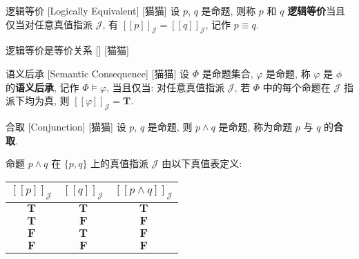 \documentclass[UTF8]{ctexart}
\newcommand{\LT}{\ensuremath{\mathbf{T}}}
\newcommand{\LF}{\ensuremath{\mathbf{F}}}
\newcommand{\assign}[2]{\ensuremath{{[\![#1]\!]}_{#2}}}
\begin{document}
            \begin{dfn}
                []
                {逻辑等价}
                [Logically Equivalent]
                [猫猫]
                设 \(p\), \(q\) 是命题, 则称 \(p\) 和 \(q\) \textbf{逻辑等价}当且仅当对任意真值指派 \(\mathcal{J}\), 有 \(\assign{p}{\mathcal{J}}=\assign{q}{\mathcal{J}}\), 记作 \(p\equiv q\). 
            \end{dfn}

            \begin{ppt}
                []
                {逻辑等价是等价关系}
                []
                [猫猫]
            \end{ppt}

            \begin{dfn}
                []
                {语义后承}
                [Semantic Consequence]
                [猫猫]
                设 \(\Phi\) 是命题集合, \(\varphi\) 是命题, 称 \(\varphi\) 是 \(\phi\) 的\textbf{语义后承}, 记作 \(\Phi\models\varphi\), 当且仅当: 对任意真值指派 \(\mathcal{J}\), 若 \(\Phi\) 中的每个命题在 \(\mathcal{J}\) 指派下均为真, 则 \(\assign{\varphi}{\mathcal{J}}=\LT\).  
            \end{dfn}

            \begin{dfn}
                []
                {合取}
                [Conjunction]
                [猫猫]
                设 \(p\), \(q\) 是命题, 则 \(p \land q\) 是命题, 称为命题 \(p\) 与 \(q\) 的\textbf{合取}. 

                命题 \(p\land q\) 在 \(\{p,q\}\) 上的真值指派 \(\mathcal{J}\) 由以下真值表定义: 
                \begin{center}
                \begin{tabular}{|c|c|c|}
                    \hline
                    \(\assign{p}{\mathcal{J}}\) & \(\assign{q}{\mathcal{J}}\) & \(\assign{p\land q}{\mathcal{J}}\) \\
                    \hline
                    \LT & \LT & \LT \\
                    \LT & \LF & \LF \\
                    \LF & \LT & \LF \\
                    \LF & \LF & \LF \\
                    \hline
                \end{tabular}
                \end{center}

            \end{dfn}
\end{document}
